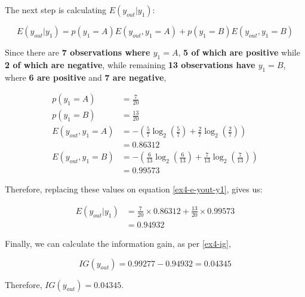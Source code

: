 \documentclass[12pt]{article}
\begin{document}
\begin{enumerate}[leftmargin=\labelsep]
          The next step is calculating $E(y_{out} | y_1)$:

          \begin{equation}\label{ex4-e-yout-y1}
              E(y_{out} | y_1) = p(y_1 = A) E(y_{out} , y_1 = A) + p(y_1 = B) E(y_{out} , y_1 = B)
          \end{equation}

          Since there are \textbf{7 observations where \(y_1 = A\)}, \textbf{5 of which are positive} while \textbf{2 of which are negative},
          while remaining \textbf{13 observations have \(y_1 = B\)}, where \textbf{6 are positive} and \textbf{7 are negative},

          \[
              \begin{aligned}
                  p(y_1 = A)          & = \frac{7}{20}                                                                                               \\
                  p(y_1 = B)          & = \frac{13}{20}                                                                                              \\
                  E(y_{out}, y_1 = A) & = - \left(\frac{5}{7} \log_2\left(\frac{5}{7}\right) + \frac{2}{7} \log_2\left(\frac{2}{7}\right)\right)     \\
                                      & = 0.86312                                                                                                    \\
                  E(y_{out}, y_1 = B) & = - \left(\frac{6}{13} \log_2\left(\frac{6}{13}\right) + \frac{7}{13} \log_2\left(\frac{7}{13}\right)\right) \\
                                      & = 0.99573
              \end{aligned}
          \]

          Therefore, replacing these values on equation \eqref{ex4-e-yout-y1}, gives us:

          \[
              \begin{aligned}
                  E(y_{out} | y_1) & = \frac{7}{20} \times 0.86312 + \frac{13}{20} \times 0.99573 \\
                                   & = 0.94932
              \end{aligned}
          \]

          Finally, we can calculate the information gain, as per \eqref{ex4-ig},

          \[
              IG(y_{out}) = 0.99277 - 0.94932 = 0.04345
          \]

          Therefore, \(IG(y_{out}) = 0.04345\).
\end{enumerate}
\end{document}
